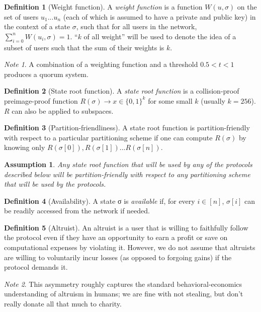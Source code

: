 \documentclass[11pt,a4paper]{report}
\theoremstyle{plain}
\newtheorem{assm}{Assumption}[chapter]
\theoremstyle{definition}
\newtheorem{defn}{Definition}[chapter]
\theoremstyle{remark}
\newtheorem*{note}{Note}
\begin{document}
\begin{defn}[Weight function]
A \emph{weight function} is a function $W(u, \sigma)$ on the set of users $u_1 ... u_n$ (each of which is assumed to have a private and public key) in the context of a state $\sigma$, such that for all users in the network, $\sum_{i=0}^n W(u_i, \sigma) = 1$. ``$k$ of all weight'' will be used to denote the idea of a subset of users such that the sum of their weights is $k$. 
\end{defn}

\begin{note}
A combination of a weighting function and a threshold $0.5 < t < 1$ produces a quorum system.
\end{note}

\begin{defn}[State root function]
A \emph{state root function} is a collision-proof preimage-proof function $R(\sigma) \rightarrow x \in \{0, 1\}^k$ for some small $k$ (usually $k = 256$). $R$ can also be applied to subspaces.
\end{defn}

\begin{defn}[Partition-friendliness]
A state root function is partition-friendly with respect to a particular partitioning scheme if one can compute $R(\sigma)$ by knowing only $R(\sigma[0]), R(\sigma[1]) ... R(\sigma[n])$. 
\end{defn}

\begin{assm}
Any state root function that will be used by any of the protocols described below will be partition-friendly with respect to any partitioning scheme that will be used by the protocols.
\end{assm}

\begin{defn}[Availability]
A state σ is \emph{available} if, for every $i \in [n]$, $\sigma[i]$ can be readily accessed from the network if needed.
\end{defn}

\begin{defn}[Altruist]
An altruist is a user that is willing to faithfully follow the protocol even if they have an opportunity to earn a profit or save on computational expenses by violating it. However, we do not assume that altruists are willing to voluntarily incur losses (as opposed to forgoing gains) if the protocol demands it.
\end{defn}

\begin{note}
This asymmetry roughly captures the standard behavioral-economics understanding of altruism in humans; we are fine with not stealing, but don't really donate all that much to charity.
\end{note}
\end{document}
